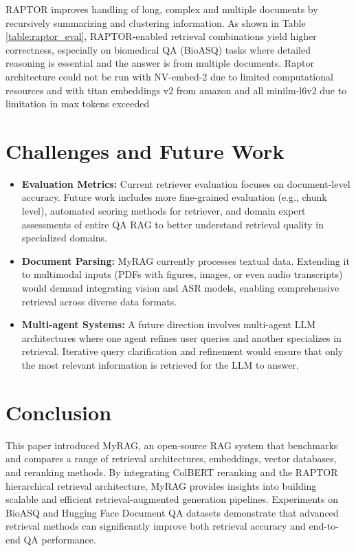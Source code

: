 \documentclass{scrartcl}
\begin{document}
RAPTOR improves handling of long, complex and multiple documents by recursively summarizing and clustering information. As shown in Table \ref{table:raptor_eval}, RAPTOR-enabled retrieval combinations yield higher correctness, especially on biomedical QA (BioASQ) tasks where detailed reasoning is essential and the answer is from multiple documents. Raptor architecture could not be run with NV-embed-2 due to limited computational resources and with titan embeddings v2 from amazon and all minilm-l6v2  due to limitation in max tokens exceeded   

\section{Challenges and Future Work}
\begin{itemize}
    \item \textbf{Evaluation Metrics:} Current retriever evaluation focuses on document-level accuracy. Future work includes more fine-grained evaluation (e.g., chunk level), automated scoring methods for retriever, and domain expert assessments of entire QA RAG to better understand retrieval quality in specialized domains.
    
    \item \textbf{Document Parsing:} MyRAG currently processes textual data. Extending it to multimodal inputs (PDFs with figures, images, or even audio transcripts) would demand integrating vision and ASR models, enabling comprehensive retrieval across diverse data formats.
    
    \item \textbf{Multi-agent Systems:} A future direction involves multi-agent LLM architectures where one agent refines user queries and another specializes in retrieval. Iterative query clarification and refinement would ensure that only the most relevant information is retrieved for the LLM to answer.
\end{itemize}

\section{Conclusion}

This paper introduced MyRAG, an open-source RAG system that benchmarks and compares a range of retrieval architectures, embeddings, vector databases, and reranking methods. By integrating ColBERT reranking and the RAPTOR hierarchical retrieval architecture, MyRAG provides insights into building scalable and efficient retrieval-augmented generation pipelines. Experiments on BioASQ and Hugging Face Document QA datasets demonstrate that advanced retrieval methods can significantly improve both retrieval accuracy and end-to-end QA performance.
\end{document}
